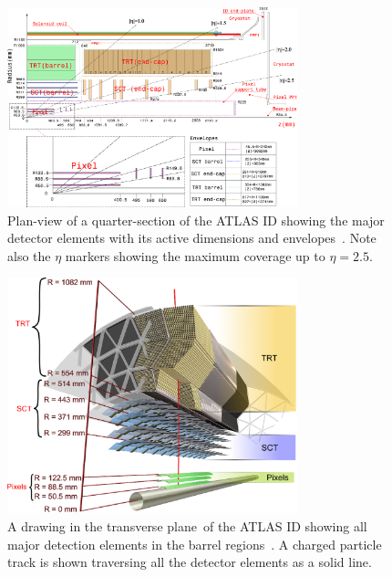 \begin{figure}
  \centering
    \includegraphics[width=0.75\textwidth]{PartDetector/Diagrams/Detector_ID_QuarterView.eps}
    \caption[Plan-view of a quarter-section of the ATLAS ID showing the major detector elements with its active dimensions and envelopes.]{Plan-view of a quarter-section of the ATLAS ID showing the major detector elements with its active dimensions and envelopes~\cite{Detector:ATLASExperimentGeneral}. Note also the $\eta$ markers showing the maximum coverage up to $\eta=2.5$.}
  \label{fig:DetectorIDQuarter}
\end{figure}
  
\begin{figure}
  \centering
    \includegraphics[width=0.75\textwidth]{PartDetector/Diagrams/ID_3D_Overview.eps}
    \caption[A drawing in the transverse plane of the ATLAS ID showing all major detection elements in the barrel regions.]{A drawing in the transverse plane of the ATLAS ID showing all major detection elements in the barrel regions~\cite{Detector:ATLASExperimentGeneral}. A charged particle track is shown traversing all the detector elements as a solid line.}
  \label{fig:DetectorIDTransverse}
\end{figure}

